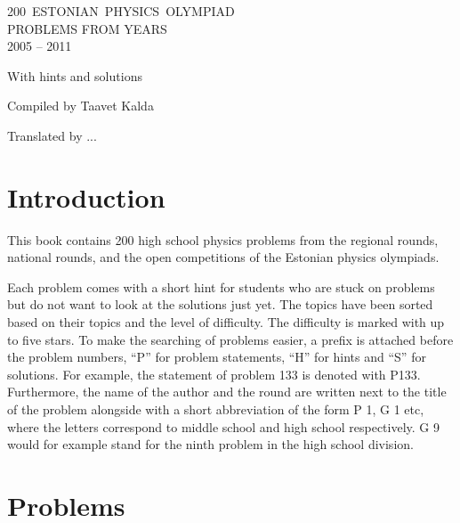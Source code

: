 \documentclass[11pt]{article}
\begin{document}

\begin{titlepage}
	\centering
	\vspace{10cm}
	{\sffamily\Huge \mbox{200 ESTONIAN PHYSICS OLYMPIAD}\\ PROBLEMS FROM YEARS\\ 2005 -- 2011\par}
	\vspace{1cm}
	{\Large With hints and solutions\par}
	\vfill
	{\Large Compiled by Taavet Kalda\par}
	\vspace{1cm}
	{\Large Translated by ...}

	\vfill

\end{titlepage}

\tableofcontents
\newpage

{\setlength{\parindent}{24pt}
\section{Introduction}

This book contains 200 high school physics problems from the regional rounds, national rounds, and the open competitions of the Estonian physics olympiads.

Each problem comes with a short hint for students who are stuck on problems but do not want to look at the solutions just yet. The topics have been sorted based on their topics and the level of difficulty. The difficulty is marked with up to five stars. To make the searching of problems easier, a prefix is attached before the problem numbers, \enquote{P} for problem statements, \enquote{H} for hints and \enquote{S} for solutions. For example, the statement of problem 133 is denoted with P133. Furthermore, the name of the author and the round are written next to the title of the problem alongside with a short abbreviation of the form P 1, G 1 etc, where the letters correspond to middle school and high school respectively. G 9 would for example stand for the ninth problem in the high school division.
}
\newpage
\setlength{\parindent}{0pt}

        \section{Problems}
        \ToggleEngStatement
        \subsection{\protect{}}
\end{document}
